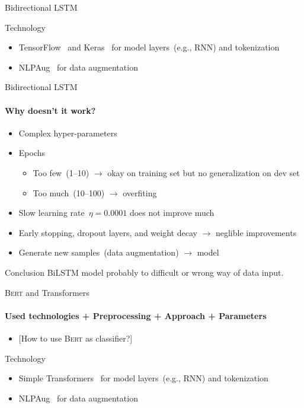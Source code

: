 \documentclass[english,handout]{mlutalk}
\newcommand{\BiLSTM}{\mbox{BiLSTM}\xspace}
\newcommand{\Bert}{\textsc{Bert}\xspace}
\newcommand{\todo}[1]{{\smaller\color{red}[#1]}}
\begin{document}
\begin{frame}[allowframebreaks]{Bidirectional LSTM}
  \begin{block}{Technology}
      \begin{itemize}
        \item TensorFlow~\cite{Abadi2015} and Keras~\cite{Chollet2015} for model layers~(e.g., RNN) and tokenization
        \item NLPAug~\cite{Edward2019} for data augmentation
      \end{itemize}
  \end{block}

\end{frame}

\begin{frame}{Bidirectional LSTM}
  \framesubtitle{Why doesn't it work?}

  \begin{itemize}
    \item Complex hyper-parameters
    \item Epochs
    \begin{itemize}
      \item Too few~(1--10) \(\to\) okay on training set but no generalization on dev set
      \item Too much~(10--100) \(\to\) overfiting
    \end{itemize}
    \item Slow learning rate~\(\eta = 0.0001\) does not improve much
    \item Early stopping, dropout layers, and weight decay \(\to\) neglible improvements
    \item Generate new samples~(data augmentation) \(\to\)  model
  \end{itemize}

  \begin{block}{Conclusion}
    \BiLSTM model probably to difficult or wrong way of data input.
  \end{block}

\end{frame}

\begin{frame}{\Bert and Transformers}
  \framesubtitle{Used technologies + Preprocessing + Approach + Parameters}

  \begin{itemize}
    \item \todo{How to use \Bert as classifier?}
  \end{itemize}
  
  \begin{block}{Technology}
    \begin{itemize}
      \item Simple Transformers~\cite{Rajapaske2019} for model layers~(e.g., RNN) and tokenization
      \item NLPAug~\cite{Edward2019} for data augmentation
    \end{itemize}
  \end{block}

\end{frame}
\end{document}
